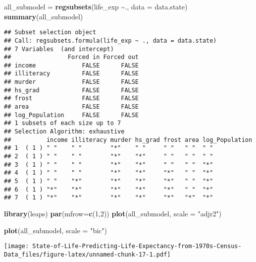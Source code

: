 \documentclass[
]{article}
\newenvironment{Shaded}{\begin{snugshade}}{\end{snugshade}}
\newcommand{\AttributeTok}[1]{\textcolor[rgb]{0.13,0.29,0.53}{#1}}
\newcommand{\DecValTok}[1]{\textcolor[rgb]{0.00,0.00,0.81}{#1}}
\newcommand{\FunctionTok}[1]{\textcolor[rgb]{0.13,0.29,0.53}{\textbf{#1}}}
\newcommand{\NormalTok}[1]{#1}
\newcommand{\OtherTok}[1]{\textcolor[rgb]{0.56,0.35,0.01}{#1}}
\newcommand{\SpecialCharTok}[1]{\textcolor[rgb]{0.81,0.36,0.00}{\textbf{#1}}}
\newcommand{\StringTok}[1]{\textcolor[rgb]{0.31,0.60,0.02}{#1}}
\begin{document}
\begin{Shaded}
\begin{Highlighting}[]
\NormalTok{all\_submodel }\OtherTok{=} \FunctionTok{regsubsets}\NormalTok{(life\_exp }\SpecialCharTok{\textasciitilde{}}\NormalTok{., }\AttributeTok{data =}\NormalTok{ data.state)}
\FunctionTok{summary}\NormalTok{(all\_submodel)}
\end{Highlighting}
\end{Shaded}

\begin{verbatim}
## Subset selection object
## Call: regsubsets.formula(life_exp ~ ., data = data.state)
## 7 Variables  (and intercept)
##                Forced in Forced out
## income             FALSE      FALSE
## illiteracy         FALSE      FALSE
## murder             FALSE      FALSE
## hs_grad            FALSE      FALSE
## frost              FALSE      FALSE
## area               FALSE      FALSE
## log_Population     FALSE      FALSE
## 1 subsets of each size up to 7
## Selection Algorithm: exhaustive
##          income illiteracy murder hs_grad frost area log_Population
## 1  ( 1 ) " "    " "        "*"    " "     " "   " "  " "           
## 2  ( 1 ) " "    " "        "*"    "*"     " "   " "  " "           
## 3  ( 1 ) " "    " "        "*"    "*"     " "   " "  "*"           
## 4  ( 1 ) " "    " "        "*"    "*"     "*"   " "  "*"           
## 5  ( 1 ) " "    "*"        "*"    "*"     "*"   " "  "*"           
## 6  ( 1 ) "*"    "*"        "*"    "*"     "*"   " "  "*"           
## 7  ( 1 ) "*"    "*"        "*"    "*"     "*"   "*"  "*"
\end{verbatim}

\begin{Shaded}
\begin{Highlighting}[]
\FunctionTok{library}\NormalTok{(leaps)}
\FunctionTok{par}\NormalTok{(}\AttributeTok{mfrow=}\FunctionTok{c}\NormalTok{(}\DecValTok{1}\NormalTok{,}\DecValTok{2}\NormalTok{))}
\FunctionTok{plot}\NormalTok{(all\_submodel, }\AttributeTok{scale =} \StringTok{"adjr2"}\NormalTok{) }

\FunctionTok{plot}\NormalTok{(all\_submodel, }\AttributeTok{scale =} \StringTok{"bic"}\NormalTok{) }
\end{Highlighting}
\end{Shaded}

\texttt{[image: State-of-Life-Predicting-Life-Expectancy-from-1970s-Census-Data\_files/figure-latex/unnamed-chunk-17-1.pdf]}

\begin{Shaded}
\end{Shaded}
\end{document}
